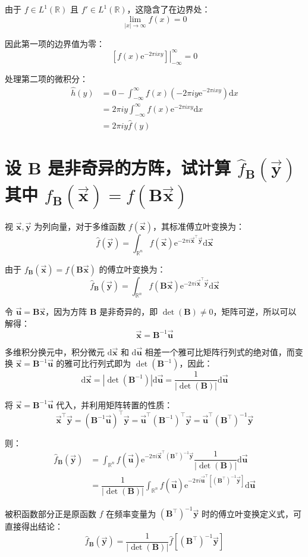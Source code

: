 \documentclass{article}
\newcommand{\eval}[2]{\left.#1\right|_{#2}}
\newcommand{\e}{\mathrm{e}}
\renewcommand{\d}{\mathrm{d}}
\begin{document}
由于 $f \in L^1(\mathbb{R})$ 且 $f' \in L^1(\mathbb{R})$，这隐含了在边界处：
\[ \lim\limits_{|x| \to \infty} f(x) = 0 \]

因此第一项的边界值为零：
\[ \eval{\left[ f(x)\e^{-2\pi i xy} \right]}{-\infty}^{\infty} = 0 \]

处理第二项的微积分：
\begin{align*}
    \hat{h}(y) &= 0 - \int_{-\infty}^{\infty} f(x) \left( -2\pi i y\e^{-2\pi i xy} \right) \d x
    \\
    &= 2\pi i y \int_{-\infty}^{\infty} f(x)\e^{-2\pi i xy} \d x
    \\
    &= 2\pi i y\hat{f}(y)
\end{align*}


\section{设 $\bm{B}$ 是非奇异的方阵，试计算 $\hat{f}_{\bm{B}}(\vec{\bm{y}})$ 其中 $f_{\bm{B}}(\vec{\bm{x}}) = f(\bm{B}\vec{\bm{x}})$}
视 $\vec{\bm{x}},\vec{\bm{y}}$ 为列向量，对于多维函数 $f(\vec{\bm{x}})$，其标准傅立叶变换为：
\[ \hat{f}(\vec{\bm{y}}) = \int_{\mathbb{R}^n} f(\vec{\bm{x}}) \e^{-2\pi i \vec{\bm{x}}^{\top}\vec{\bm{y}}} \d \vec{\bm{x}} \]

由于 $f_{\bm{B}}(\vec{\bm{x}}) = f(\bm{B}\vec{\bm{x}})$ 的傅立叶变换为：
\[ \hat{f}_{\bm{B}}(\vec{\bm{y}}) = \int_{\mathbb{R}^n} f(\bm{B}\vec{\bm{x}}) \e^{-2\pi i \vec{\bm{x}}^{\top}\vec{\bm{y}}} \d \vec{\bm{x}} \]

令 $\vec{\bm{u}} = \bm{B}\vec{\bm{x}}$，因为方阵 $\bm{B}$ 是非奇异的，即 $\det(\bm{B}) \neq 0$，矩阵可逆，所以可以解得：
\[ \vec{\bm{x}} = \bm{B}^{-1}\vec{\bm{u}} \]

多维积分换元中，积分微元 $\d \vec{\bm{x}}$ 和 $\d \vec{\bm{u}}$ 相差一个雅可比矩阵行列式的绝对值，而变换 $\vec{\bm{x}} = \bm{B}^{-1}\vec{\bm{u}}$ 的雅可比行列式即为 $\det(\bm{B}^{-1})$，因此：
\[ \d\vec{\bm{x}} = \left| \det(\bm{B}^{-1}) \right| \d\vec{\bm{u}} = \dfrac{1}{|\det(\bm{B})|} \d\vec{\bm{u}} \]

将 $\vec{\bm{x}} = \bm{B}^{-1}\vec{\bm{u}}$ 代入，并利用矩阵转置的性质：
\[ \vec{\bm{x}}^{\top}\vec{\bm{y}} = (\bm{B}^{-1}\vec{\bm{u}})^{\top}\vec{\bm{y}} = \vec{\bm{u}}^{\top} (\bm{B}^{-1})^{\top}\vec{\bm{y}} = \vec{\bm{u}}^{\top} (\bm{B}^{\top})^{-1} \vec{\bm{y}} \]

则：
\begin{align*}
    \hat{f}_{\bm{B}}(\vec{\bm{y}}) &= \int_{\mathbb{R}^n} f(\vec{\bm{u}}) \e^{-2\pi i \vec{\bm{x}}^{\top} (\bm{B}^{\top})^{-1} \vec{\bm{y}}} \dfrac{1}{|\det(\bm{B})|} \d\vec{\bm{u}}
    \\[7pt]
    &= \dfrac{1}{|\det(\bm{B})|} \int_{\mathbb{R}^n} f(\vec{\bm{u}}) \e^{-2\pi i \vec{\bm{u}}^{\top} \left[(\bm{B}^{\top})^{-1}\vec{\bm{y}}\right]} \d\vec{\bm{u}}
\end{align*}

被积函数部分正是原函数 $f$ 在频率变量为 $(\bm{B}^{\top})^{-1}\vec{\bm{y}}$ 时的傅立叶变换定义式，可直接得出结论：
\[ \hat{f}_{\bm{B}}(\vec{\bm{y}}) = \dfrac{1}{|\det(\bm{B})|} \hat{f}\left[(\bm{B}^{\top})^{-1}\vec{\bm{y}}\right] \]
\end{document}
